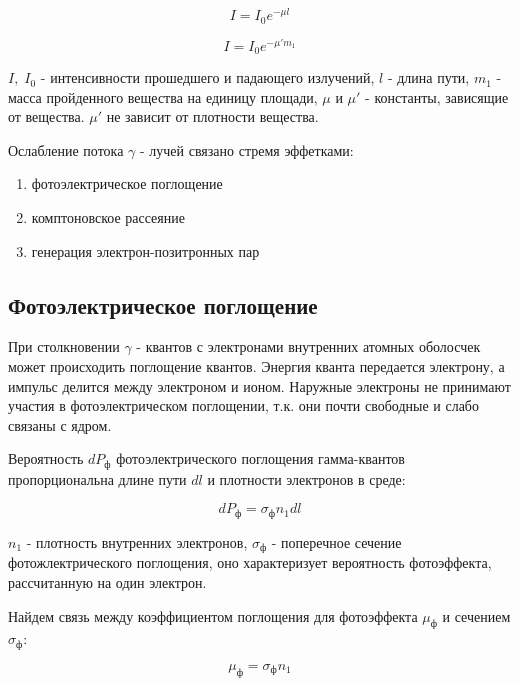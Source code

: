 \documentclass[a4paper]{article}
\begin{document}
\begin{equation}
    I = I_0 e^{-\mu l}
\end{equation}

\begin{equation}
    I = I_0 e^{-\mu' m_1}
\end{equation}

$I, \; I_0$ - интенсивности прошедшего и падающего излучений, $l$  - длина пути, $m_1$ - масса 
пройденного вещества на единицу площади, $\mu$ и $\mu'$ - константы, зависящие от вещества. $\mu'$ 
не зависит от плотности вещества. \par 

Ослабление потока $\gamma$ - лучей связано стремя эффетками: 
\begin{enumerate}
    \item фотоэлектрическое поглощение
    \item комптоновское рассеяние
    \item генерация электрон-позитронных пар
\end{enumerate}



\subsection{Фотоэлектрическое поглощение}

При столкновении $\gamma$ - квантов с электронами внутренних атомных оболосчек может происходить поглощение 
квантов. Энергия кванта передается электрону, а импульс делится между электроном и ионом. Наружные электроны 
не принимают участия в фотоэлектрическом поглощении, т.к. они почти свободные и слабо связаны с ядром. \par 

Вероятность $dP_ф$ фотоэлектрического поглощения гамма-квантов пропорциональна длине пути $dl$ и плотности 
электронов в среде:

\begin{equation}
    dP_ф = \sigma_ф n_1 dl
\end{equation}

$n_1$ - плотность внутренних электронов, $\sigma_ф$ - поперечное сечение фотожлектрического поглощения, 
оно характеризует вероятность фотоэффекта, рассчитанную на один электрон. \par 

Найдем связь между коэффициентом поглощения для фотоэффекта $\mu_ф$ и сечением $\sigma_ф$:

\begin{equation}
    \mu_ф = \sigma_ф n_1
\end{equation}
\end{document}
